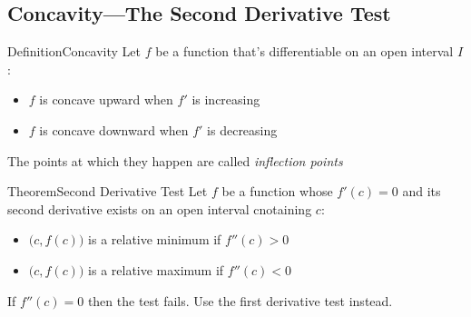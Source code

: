 \documentclass{MathNotes}
\newenvironment{definition}[1]{\begin{RedBox}{Definition}{#1}}{\end{RedBox}}
\newenvironment{theorem}[1]{\begin{GrayBox}{Theorem}{#1}}{\end{GrayBox}}
\begin{document}
\newpage

\subsection{Concavity---The Second Derivative Test}
\begin{multicols}{2}
	\begin{definition}{Concavity}
		Let $f$ be a function that's differentiable on an open interval $I$:
		\begin{itemize}
			\item $f$ is concave upward when $f'$ is increasing
			\item $f$ is concave downward when $f'$ is decreasing
		\end{itemize}
		The points at which they happen are called \textit{inflection points}
	\end{definition}
	\begin{center}
	\end{center}
\end{multicols}

\begin{theorem}{Second Derivative Test}
	Let $f$ be a function whose $f'(c)=0$ and its second derivative exists on an
	open interval cnotaining $c$:
	\begin{itemize}
		\item $\big(c, f(c)\big)$ is a relative minimum if $f''(c)>0$
		\item $\big(c, f(c)\big)$ is a relative maximum if $f''(c)<0$
	\end{itemize}
	If $f''(c)=0$ then the test fails. Use the first derivative test instead.
\end{theorem}
\end{document}
